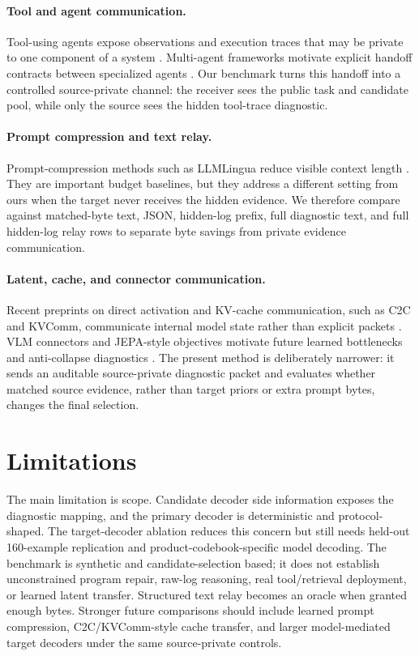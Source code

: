 \documentclass{article}
\begin{document}
\paragraph{Tool and agent communication.}
Tool-using agents expose observations and execution traces that may be private
to one component of a system \citep{yao2022react,schick2023toolformer}.
Multi-agent frameworks motivate explicit handoff contracts between specialized
agents \citep{wu2023autogen}. Our benchmark turns this handoff into a
controlled source-private channel: the receiver sees the public task and
candidate pool, while only the source sees the hidden tool-trace diagnostic.

\paragraph{Prompt compression and text relay.}
Prompt-compression methods such as LLMLingua reduce visible context length
\citep{jiang2023llmlingua}. They are important budget baselines, but they
address a different setting from ours when the target never receives the hidden
evidence. We therefore compare against matched-byte text, JSON, hidden-log
prefix, full diagnostic text, and full hidden-log relay rows to separate byte
savings from private evidence communication.

\paragraph{Latent, cache, and connector communication.}
Recent preprints on direct activation and KV-cache communication, such as C2C
and KVComm, communicate internal model state rather than explicit packets
\citep{fu2025c2c,shi2025kvcomm}. VLM connectors and JEPA-style objectives
motivate future learned bottlenecks and anti-collapse diagnostics
\citep{alayrac2022flamingo,li2023blip2,assran2023ijepa,bardes2021vicreg}.
The present method is deliberately narrower: it sends an auditable
source-private diagnostic packet and evaluates whether matched source evidence,
rather than target priors or extra prompt bytes, changes the final selection.

\section{Limitations}

The main limitation is scope. Candidate decoder side information exposes the
diagnostic mapping, and the primary decoder is deterministic and
protocol-shaped. The target-decoder ablation reduces this concern but still
needs held-out 160-example replication and product-codebook-specific model
decoding. The benchmark is synthetic and candidate-selection based; it does not
establish unconstrained program repair, raw-log reasoning, real tool/retrieval
deployment, or learned latent transfer. Structured text relay becomes an oracle
when granted enough bytes. Stronger future comparisons should include learned
prompt compression, C2C/KVComm-style cache transfer, and larger model-mediated
target decoders under the same source-private controls.
\end{document}
